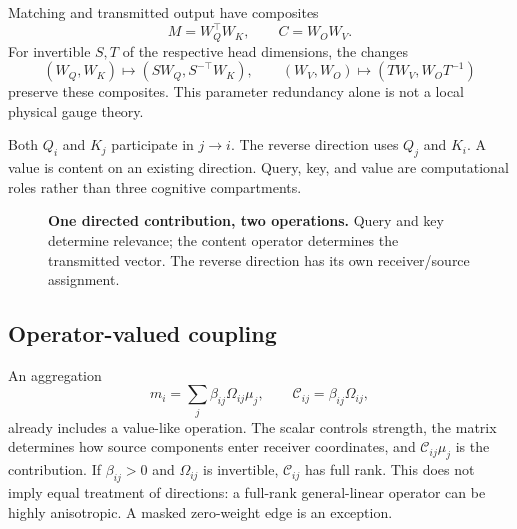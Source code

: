 \documentclass[11pt,letterpaper]{article}
\theoremstyle{remark}
\begin{document}
Matching and transmitted output have composites
\begin{equation}
 M=W_Q^\top W_K,\qquad C=W_OW_V.
\end{equation}
For invertible $S,T$ of the respective head dimensions, the changes
\begin{equation}
 (W_Q,W_K)\mapsto(SW_Q,S^{-\top}W_K),\qquad
 (W_V,W_O)\mapsto(TW_V,W_OT^{-1})
\end{equation}
preserve these composites. This parameter redundancy alone is not a local physical gauge theory.

Both $Q_i$ and $K_j$ participate in $j\to i$. The reverse direction uses $Q_j$ and $K_i$. A value is content on an existing direction. Query, key, and value are computational roles rather than three cognitive compartments.

\begin{figure}[tb]
\centering
{}
\caption{\textbf{One directed contribution, two operations.} Query and key determine relevance; the content operator determines the transmitted vector. The reverse direction has its own receiver/source assignment.}
\end{figure}

\subsection{Operator-valued coupling}
An aggregation
\begin{equation}
 m_i=\sum_j\beta_{ij}\Omega_{ij}\mu_j,\qquad
 \mathcal C_{ij}=\beta_{ij}\Omega_{ij},
 \label{eq:coupling}
\end{equation}
already includes a value-like operation. The scalar controls strength, the matrix determines how source components enter receiver coordinates, and $\mathcal C_{ij}\mu_j$ is the contribution. If $\beta_{ij}>0$ and $\Omega_{ij}$ is invertible, $\mathcal C_{ij}$ has full rank. This does not imply equal treatment of directions: a full-rank general-linear operator can be highly anisotropic. A masked zero-weight edge is an exception.
\end{document}
